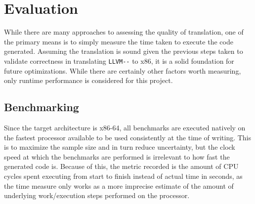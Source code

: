 \documentclass{article}
\begin{document}


\section{Evaluation}

While there are many approaches to assessing the quality of translation, one of the primary means is to simply measure the time taken to execute the code generated. 
Assuming the translation is sound given the previous steps taken to validate correctness in translating \lstinline!LLVM--! to x86, it is a solid foundation for future optimizations. While there are certainly other factors worth measuring, only runtime performance is considered for this project. %







\subsection{Benchmarking}


Since the target architecture is x86-64, all benchmarks are executed natively on the fastest processor available to be used consistently at the time of writing. This is to maximize the sample size and in turn reduce uncertainty, but the clock speed at which the benchmarks are performed is irrelevant to how fast the generated code is. Because of this, the metric recorded is the amount of CPU cycles spent executing from start to finish instead of actual time in seconds, as the time measure only works as a more imprecise estimate of the amount of underlying work/execution steps performed on the processor.
\end{document}
